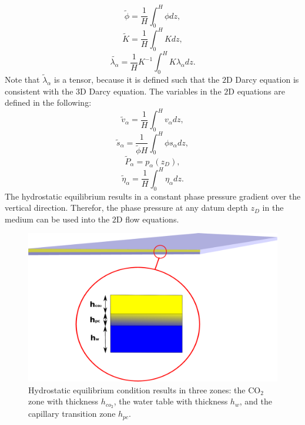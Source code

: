 \begin{equation}
\tilde{\phi}=\frac{1}{H}\int_0^H\phi dz,
\label{eq:phi_}
\end{equation}
\begin{equation}
\tilde{K}=\frac{1}{H}\int_0^H K dz,
\label{eq:K_}
\end{equation}
\begin{equation}
\tilde{\lambda_{\alpha}}=\frac{1}{H}K^{-1}\int_0^HK\lambda_{\alpha} dz.
\label{eq:lambda_}
\end{equation} Note that $\tilde\lambda_\alpha$ is a tensor, because it is
defined such that the $2\mbox{D}$ Darcy equation is consistent with the
$3\mbox{D}$ Darcy equation. The variables in the $2\mbox{D}$ equations are
defined in the following:
\begin{equation}
\tilde{v}_\alpha=\frac{1}{H}\int_0^H v_\alpha dz,
\label{eq:v_}
\end{equation}
\begin{equation}
\tilde{s}_\alpha=\frac{1}{\tilde{\phi}H}\int_0^H \phi s_\alpha dz,
\label{eq:s_}
\end{equation}
\begin{equation}
\tilde{P}_\alpha=p_{\alpha}(z_D),
\label{eq:p_}
\end{equation}
\begin{equation}
\tilde{\eta}_\alpha=\frac{1}{H}\int_0^H \eta_\alpha dz.
\label{eq:eta_}
\end{equation} The hydrostatic equilibrium results in a constant phase pressure
gradient over the vertical direction. Therefor, the phase pressure at any datum
depth $z_D$ in the medium can be used into the $2\mbox{D}$ flow equations. 


\begin{figure}[thb]
 \centering{}
 \includegraphics[width=1\linewidth]{./figurer/VACOL.eps}
 \caption{Hydrostatic equilibrium condition results in three zones:
the $\mbox{CO}_2$ zone with thickness $h_{co_2}$, the water table with thickness
$h_{w}$, and the capillary transition zone $h_{pc}$.}
 \label{fig:VC}
\end{figure}


